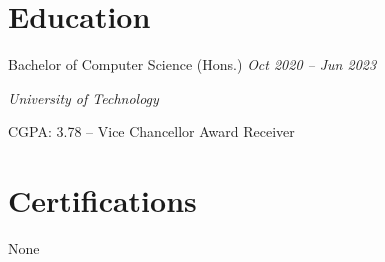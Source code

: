\documentclass[11pt]{article}
\newcommand{\job}[3]{%
  \vspace{4pt}%
  {\fontsize{9pt}{12pt}\poppinsmedium\color{accent}#1}%
  \hfill
  {\fontsize{9pt}{12pt}\poppinslight\itshape #2}\par
  {\fontsize{9pt}{12pt}\poppinslight\itshape #3}\par
}
\begin{document}
\section{Education}

\job{Bachelor of Computer Science (Hons.)}{Oct 2020 -- Jun 2023}{University of Technology}
{\fontsize{8pt}{12pt}\poppinslight
CGPA: 3.78 -- Vice Chancellor Award Receiver
}

\section{Certifications}
{\fontsize{8pt}{12pt}\poppinslight None}
\end{document}

